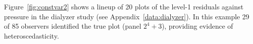 \documentclass[12pt]{article} %
\newcommand{\al}[1]{{\color{ForestGreen} #1}}
\newcommand{\hhnote}[1]{\todo[inline,color=orange!40]{#1}}
\begin{document}
Figure~\ref{fig:constvar2} shows a lineup of 20 plots of the level-1 residuals against pressure in the dialyzer study (see Appendix~\ref{data:dialyzer}).
 In this example 29 of 85 observers identified the true plot (panel $2^4 +3$), providing evidence of heteroscedasticity. 
\end{document}
